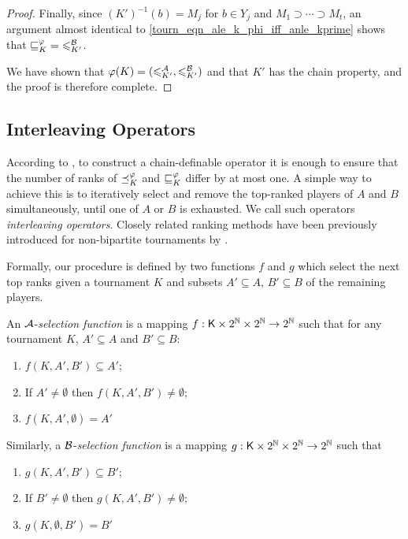\begin{proof}
    Finally, since $(K')^{-1}(b) = M_j$ for $b \in Y_j$ and $M_1 \supset \cdots
    \supset M_t$, an argument almost identical to
    \cref{tourn_eqn_ale_k_phi_iff_anle_kprime} shows that ${\sqsubseteq_K^\varphi} =
    {\leqslant^{\mathcal{B}}_{K'}}$.

    We have shown that $\varphi(K) = ({\leqslant^{\mathcal{A}}_{K'}}, {\leqslant^{\mathcal{B}}_{K'}})$ and that $K'$
    has the chain property, and the proof is therefore complete.
\end{proof}

\subsection{Interleaving Operators}
\label{tourn_sec_interleaving}

According to , to construct a
chain-definable operator it is enough to ensure that the number of ranks of
$\preceq_K^\varphi$ and $\sqsubseteq_K^\varphi$ differ by at most one. A simple way to achieve
this is to iteratively select and remove the top-ranked players of $A$ and $B$
simultaneously, until one of $A$ or $B$ is exhausted. We call such operators
\emph{interleaving operators}. Closely related ranking methods have been
previously introduced for non-bipartite tournaments by
\textcite{bouyssou2004monotonicity}.

Formally, our procedure is defined by two functions $f$ and $g$ which select
the next top ranks given a tournament $K$ and subsets $A' \subseteq A$, $B'
\subseteq B$ of the remaining players.

\begin{definition}%
    \label{tourn_def_selectionfunction}

     An $\mathcal{A}$-\emph{selection function} is a mapping $f: \mathsf{K} \times 2^{\mathbb{N}} \times
     2^{\mathbb{N}} \to 2^{\mathbb{N}}$ such that for any tournament $K$, $A' \subseteq A$ and $B'
     \subseteq B$:
    \begin{enumerate}
        \item \label{tourn_item_f_sel_1} $f(K, A', B') \subseteq A'$;
        \item \label{tourn_item_f_sel_2} If $A' \ne \emptyset$ then $f(K, A', B') \ne
              \emptyset$;
        \item \label{tourn_item_f_sel_3} $f(K, A', \emptyset) = A'$
    \end{enumerate}

    Similarly, a $\mathcal{B}$-\emph{selection function} is a mapping $g: \mathsf{K} \times 2^{\mathbb{N}}
    \times 2^{\mathbb{N}} \to 2^{\mathbb{N}}$ such that
    \begin{enumerate}
        \item \label{tourn_item_g_sel_1} $g(K, A', B') \subseteq B'$;
        \item \label{tourn_item_g_sel_2} If $B' \ne \emptyset$ then $g(K, A', B') \ne
              \emptyset$;
        \item \label{tourn_item_g_sel_3} $g(K, \emptyset, B') = B'$
    \end{enumerate}

\end{definition}

